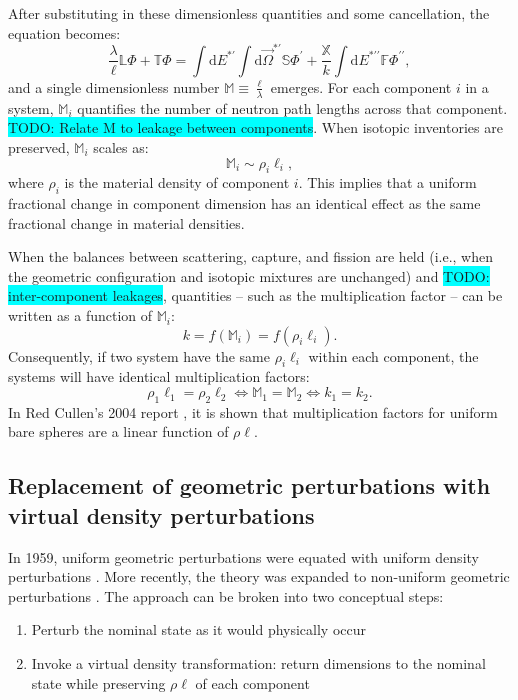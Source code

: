 \documentclass[10pt]{article}
\newcommand{\todo}[1]{\colorbox{cyan}{TODO: #1}}
\begin{document}
After substituting in these dimensionless quantities and some cancellation, the equation becomes:
\begin{equation}
    \frac{\lambda}{\ell} \mathbb{L} \Phi
    + \mathbb{T} \Phi
    = \int \mathrm{d} E ^ {*\prime} \int \mathrm{d} \vec \Omega ^ {*\prime} \mathbb{S} \Phi ^ \prime
    + \frac{\mathbb{X}}{k} \int \mathrm{d} E ^ {*\prime\prime} \mathbb{F} \Phi ^ {\prime\prime}
    ,
\end{equation}
and a single dimensionless number $\mathbb{M} \equiv \frac{\ell}{\lambda}$ emerges.
For each component $i$ in a system, $\mathbb{M}_i$  quantifies the number of neutron path lengths across that component.
\todo{Relate M to leakage between components}.
When isotopic inventories are preserved, $\mathbb{M}_i$ scales as:
\begin{equation}
    \mathbb{M}_i \sim \rho_i\ell_i
    ,
\end{equation}
where $\rho_i$ is the material density of component $i$.
This implies that a uniform fractional change in component dimension has an identical effect as the same fractional change in material densities.

When the balances between scattering, capture, and fission are held (i.e., when the geometric configuration and isotopic mixtures are unchanged) and \todo{inter-component leakages}, quantities -- such as the multiplication factor -- can be written as a function of $\mathbb{M}_i$:
\begin{equation}
    k = f(\mathbb{M}_i)
    = f\left(\rho_i\ell_i\right)
    .
\end{equation}
Consequently, if two system have the same  $\rho_i\ell_i$ within each component, the systems will have identical multiplication factors:
\begin{equation}
    \label{eqn:virtualDensity}
    \rho_1\ell_1 = \rho_2\ell_2
    \iff \mathbb{M}_1 = \mathbb{M}_2
    \iff k_1 = k_2
    .
\end{equation}
In Red Cullen's 2004 report \cite{cullen2004mad}, it is shown that multiplication factors for uniform bare spheres are a linear function of $\rho\ell$.

\subsection{ Replacement of geometric perturbations with virtual density perturbations }

In 1959, uniform geometric perturbations were equated with uniform density perturbations \cite{shikhov1959cec}.
More recently, the theory was expanded to non-uniform geometric perturbations \cite{reed2012vdp}.
The approach can be broken into two conceptual steps:
\begin{enumerate}
    \item Perturb the nominal state as it would physically occur
    \item Invoke a virtual density transformation: return dimensions to the nominal state while preserving $\rho \ell$ of each component
\end{enumerate}
\end{document}
